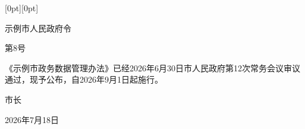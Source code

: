 \documentclass[linespread=1.81, twoside]{ctexart}
\begin{document}
\noindent\raisebox{0pt}[0pt][0pt]{\parbox[t]{\textwidth}{\mbox{}}}\par
\vspace*{\dimexpr\gwlogodrop-\topskip-\baselineskip-5.5mm\relax}
{\centering\gwlogosize\xbsong\color{gwred}示例市人民政府令\par}
\nointerlineskip
\vspace{\dimexpr 2\baselineskip-4mm\relax}
{\centering 第8号\par}
\nointerlineskip
\vspace{\dimexpr 2\baselineskip-4mm\relax}

《示例市政务数据管理办法》已经2026年6月30日市人民政府第12次常务会议审议
通过，现予公布，自2026年9月1日起施行。

\par\nointerlineskip
\vspace{\dimexpr 2\baselineskip-4mm\relax}
\noindent\hfill 市\hspace{1\ccwd}长\hspace{2\ccwd}\hspace*{\dimexpr 24mm+4\ccwd\relax}\par
\par\nointerlineskip
\vspace{\baselineskip}
\noindent\hfill 2026年7月18日\hspace*{4\ccwd}\par
\end{document}
